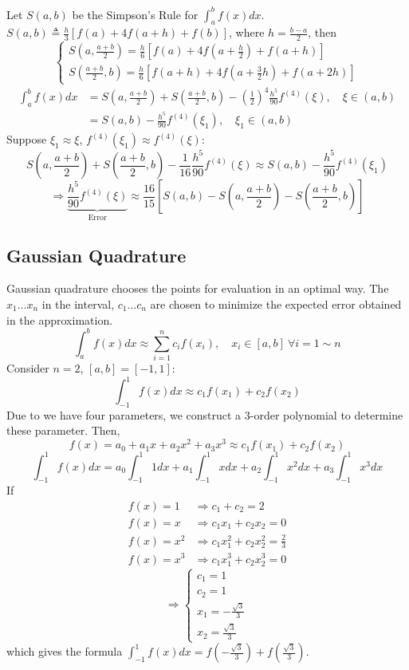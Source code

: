 \documentclass[12pt, a4paper]{article}
\theoremstyle{break}
\begin{document}
Let $S(a,b)$ be the Simpson's Rule for $\int_a^b f(x) dx$.
$S(a,b) \triangleq \frac{h}{3}[f(a) + 4f(a+h) + f(b)]$, where $h = \frac{b-a}{2}$, then
\[ \begin{cases} S(a, \frac{a+b}{2}) = \frac{h}{6}[f(a) + 4f(a+\frac{h}{2}) + f(a+h)] \\ S(\frac{a+b}{2}, b) = \frac{h}{6}[f(a+h) + 4f(a+\frac{3}{2}h) + f(a+2h)] \end{cases} \]
\begin{align*}
\int_a^b f(x) dx &= S(a, \frac{a+b}{2}) + S(\frac{a+b}{2}, b) - \left(\frac{1}{2}\right)^4 \frac{h^5}{90} f^{(4)}(\xi), \quad \xi \in (a,b) \\
&= S(a, b) - \frac{h^5}{90} f^{(4)}(\xi_1), \quad \xi_1 \in (a,b)
\end{align*}
Suppose $\xi_1 \approx \xi$, $f^{(4)}(\xi_1) \approx f^{(4)}(\xi)$:
\[ S(a, \frac{a+b}{2}) + S(\frac{a+b}{2}, b) - \frac{1}{16} \frac{h^5}{90} f^{(4)}(\xi) \approx S(a, b) - \frac{h^5}{90} f^{(4)}(\xi_1) \]
\[ \Rightarrow \underbrace{\frac{h^5}{90} f^{(4)}(\xi)}_{\text{Error}} \approx \frac{16}{15} \left[ S(a, b) - S(a, \frac{a+b}{2}) - S(\frac{a+b}{2}, b) \right] \]

\subsection{Gaussian Quadrature}
Gaussian quadrature chooses the points for evaluation in an optimal way. The $x_1 \dots x_n$ in the interval, $c_1 \dots c_n$ are chosen to minimize the expected error obtained in the approximation.
\[ \int_a^b f(x) dx \approx \sum_{i=1}^n c_i f(x_i), \quad x_i \in [a,b] \ \forall i=1\sim n \]
Consider $n=2$, $[a,b] = [-1,1]$:
\[ \int_{-1}^1 f(x) dx \approx c_1 f(x_1) + c_2 f(x_2) \]
Due to we have four parameters, we construct a 3-order polynomial to determine these parameter. Then,
\[ f(x) = a_0 + a_1 x + a_2 x^2 + a_3 x^3 \approx c_1 f(x_1) + c_2 f(x_2) \]
\[ \int_{-1}^1 f(x) dx = a_0 \int_{-1}^1 1 dx + a_1 \int_{-1}^1 x dx + a_2 \int_{-1}^1 x^2 dx + a_3 \int_{-1}^1 x^3 dx \]
If
\begin{align*}
f(x)=1 &\Rightarrow c_1 + c_2 = 2 \\
f(x)=x &\Rightarrow c_1 x_1 + c_2 x_2 = 0 \\
f(x)=x^2 &\Rightarrow c_1 x_1^2 + c_2 x_2^2 = \frac{2}{3} \\
f(x)=x^3 &\Rightarrow c_1 x_1^3 + c_2 x_2^3 = 0 
\end{align*}
\[ \Rightarrow \begin{cases} c_1 = 1 \\ c_2 = 1 \\ x_1 = -\frac{\sqrt{3}}{3} \\ x_2 = \frac{\sqrt{3}}{3} \end{cases} \]
which gives the formula $\int_{-1}^1 f(x) dx = f\left(-\frac{\sqrt{3}}{3}\right) + f\left(\frac{\sqrt{3}}{3}\right)$.
\end{document}
